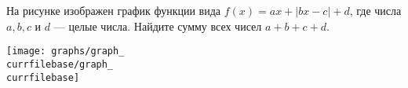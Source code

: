 \begin{ex}
	\begin{condition}
		\begin{minipage}[t]{0.67\textwidth}
			На рисунке изображен график функции вида \( f(x)=ax+|bx-c|+d \), где числа \( a, b, c \) и \( d \) --- целые числа. Найдите сумму всех чисел \( a+b+c+d \).
		\end{minipage}
		\begin{minipage}[c]{0.25\textwidth}
			\texttt{[image: graphs/graph\_\\currfilebase/graph\_\\currfilebase]}
		\end{minipage}
	\end{condition}
\end{ex}
